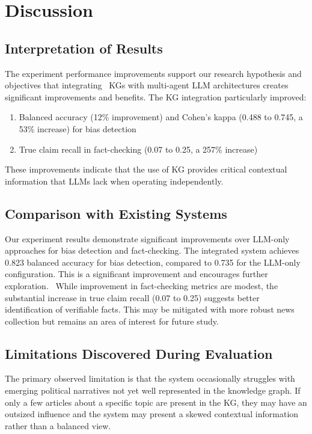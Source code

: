 \documentclass{scrartcl}
\begin{document}
\section{Discussion}
\subsection{Interpretation of Results}
The experiment performance improvements support our research hypothesis and objectives that integrating  KGs with multi-agent LLM architectures creates significant improvements and benefits. The KG integration particularly improved:
\begin{enumerate}
    \item Balanced accuracy (12\% improvement) and Cohen’s kappa (0.488 to 0.745, a 53\% increase) for bias detection
    \item True claim recall in fact-checking (0.07 to 0.25, a 257\% increase)
\end{enumerate}

These improvements indicate that the use of KG provides critical contextual information that LLMs lack when operating independently.

\subsection{Comparison with Existing Systems}

Our experiment results demonstrate significant improvements over LLM-only approaches for bias detection and fact-checking. The integrated system achieves 0.823 balanced accuracy for bias detection, compared to 0.735 for the LLM-only configuration. This is a significant improvement and encourages further exploration. 
While improvement in fact-checking metrics are modest, the substantial increase in true claim recall (0.07 to 0.25) suggests better identification of verifiable facts. This may be mitigated with more robust news collection but remains an area of interest for future study.

\subsection{Limitations Discovered During Evaluation}
The primary observed limitation is that the system occasionally struggles with emerging political narratives not yet well represented in the knowledge graph. If only a few articles about a specific topic are present in the KG, they may have an outsized influence and the system may present a skewed contextual information rather than a balanced view. 
\end{document}
